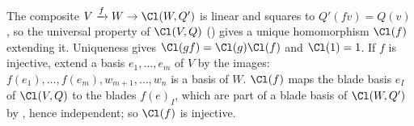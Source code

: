 The composite $V \xrightarrow{f} W \to \Cl(W, Q')$ is linear and squares to $Q'(f v) = Q(v)$, so the universal property of $\Cl(V, Q)$ () gives a unique homomorphism $\Cl(f)$ extending it. Uniqueness gives $\Cl(g f) = \Cl(g)\Cl(f)$ and $\Cl(1) = 1$. If $f$ is injective, extend a basis $e_1, \dots, e_m$ of $V$ by the images: $f(e_1), \dots, f(e_m), w_{m+1}, \dots, w_n$ is a basis of $W$. $\Cl(f)$ maps the blade basis $e_I$ of $\Cl(V, Q)$ to the blades $f(e)_I$, which are part of a blade basis of $\Cl(W, Q')$ by , hence independent; so $\Cl(f)$ is injective.
